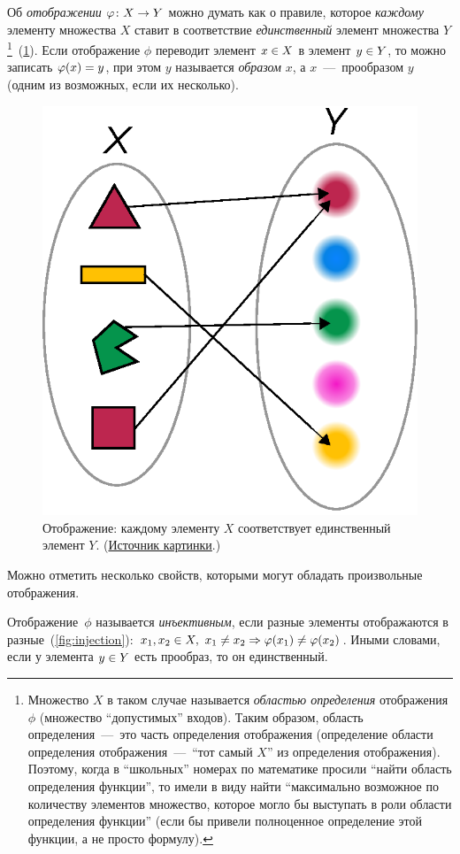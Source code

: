 \documentclass[a4paper,12pt]{article}
\begin{document}
  Об \emph{отображении} $\phi\colon X \hm\to Y$ можно думать как о правиле, которое \emph{каждому} элементу множества $X$ ставит в соответствие \emph{единственный} элемент множества $Y$\footnote{Множество $X$ в таком случае называется \emph{областью определения} отображения $\phi$ (множество ``допустимых'' входов). Таким образом, область определения~---~это часть определения отображения (определение области определения отображения~---~``тот самый $X$'' из определения отображения). Поэтому, когда в ``школьных'' номерах по математике просили ``найти область определения функции'', то имели в виду найти ``максимально возможное по количеству элементов множество, которое могло бы выступать в роли области определения функции'' (если бы привели полноценное определение этой функции, а не просто формулу).}~(\ref{fig:function}).
  Если отображение $\phi$ переводит элемент $x \hm\in X$ в элемент $y \hm\in Y$, то можно записать $\phi(x) \hm= y$, при этом $y$ называется \emph{образом} $x$, а $x$~---~прообразом $y$ (одним из возможных, если их несколько).
  
  \begin{figure}[h]
    \centering
  
    \includegraphics[width=0.3\columnwidth]{function}
  
    \caption{
      Отображение: каждому элементу $X$ соответствует единственный элемент $Y$.
      ({\small \href{https://en.wikipedia.org/wiki/Function\_(mathematics)\#/media/File:Function_color_example_3.svg}{Источник картинки}.})
    }
    \label{fig:function}
  \end{figure}
  
  
  Можно отметить несколько свойств, которыми могут обладать произвольные отображения.
  
  \begin{definition}
    Отображение~$\phi$ называется \emph{инъективным}, если разные элементы отображаются в разные~(\ref{fig:injection}):
    $
      x_1, x_2 \hm\in X,\ x_1 \hm{\not=} x_2 \hm\Rightarrow \phi(x_1) \hm{\not=} \phi(x_2)
    $.
    Иными словами, если у элемента $y \hm\in Y$ есть прообраз, то он единственный.
  \end{definition}
  
\end{document}
